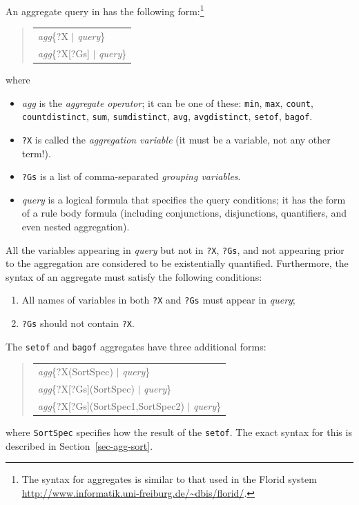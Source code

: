 \documentclass[11pt]{article}
\newcommand{\ERGO}{\mbox{\smaller{\ensuremath{\cal{E}}\smaller{{\sc{RGO}}}}}\xspace}
\newcommand{\FLSYSTEM}{\ERGO}
\newenvironment{qrules}{\begin{quote}\tt\begin{tabular}[t]{l}}%
{\end{tabular}\end{quote}}
\newcommand{\FLORID}{{\mbox{\sc Florid}}\xspace}
\begin{document}
An aggregate query in \FLSYSTEM has the following form:\footnote{
The syntax for aggregates is similar to that used in the \FLORID
system
  \url{http://www.informatik.uni-freiburg.de/~dbis/florid/}.
}
\begin{qrules}
\textnormal{\emph{agg}}\{?X $|$ {\it query}\}\\
\textnormal{\emph{agg}}\{?X[?Gs] $|$ {\it query}\}\\
\end{qrules}
%
where
\begin{itemize}
\item  \emph{agg} is the \emph{aggregate operator};  it can be one of these:
  \texttt{min},
  \texttt{max}, \texttt{count}, \texttt{countdistinct},  \texttt{sum},
  \texttt{sumdistinct},  \texttt{avg}, \texttt{avgdistinct},  \texttt{setof},
  \texttt{bagof}.
\item {\tt ?X} is called the \emph{aggregation variable} (it must be a
  variable, not any other term!).
\item {\tt ?Gs} is a list of comma-separated \emph{grouping variables}.
\item {\it query} is a logical formula that specifies the
  query conditions; it has the form of a rule body formula (including
  conjunctions, disjunctions, quantifiers, and even nested aggregation).
\end{itemize}

All the variables appearing in {\it query} but not in {\tt ?X}, {\tt ?Gs},
and not appearing prior to the aggregation are
considered to be existentially quantified. Furthermore, the syntax of an
aggregate must satisfy the following conditions:
\begin{enumerate}
\item All names of variables in both {\tt ?X} and {\tt ?Gs} must
appear in {\it query};
\item {\tt ?Gs} should not contain {\tt ?X}.
\end{enumerate}

\noindent
The \texttt{setof} and \texttt{bagof} aggregates have three additional
forms:  
\begin{qrules}
\textnormal{\emph{agg}}\{?X(SortSpec) $|$ {\it query}\}\\
\textnormal{\emph{agg}}\{?X[?Gs](SortSpec) $|$ {\it query}\}\\
\textnormal{\emph{agg}}\{?X[?Gs](SortSpec1,SortSpec2) $|$ {\it query}\}
\end{qrules}
where \texttt{SortSpec} specifies how the result of the \texttt{setof}. The
exact syntax for this is described in Section~\ref{sec-agg-sort}.
\end{document}
